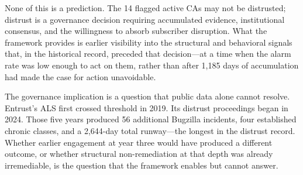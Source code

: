 \documentclass[10pt,twocolumn,letterpaper]{article}
\begin{document}
None of this is a prediction. The 14 flagged active CAs may not be distrusted; distrust
is a governance decision requiring accumulated evidence, institutional consensus, and the
willingness to absorb subscriber disruption. What the framework provides is earlier
visibility into the structural and behavioral signals that, in the historical record,
preceded that decision---at a time when the alarm rate was low enough to act on them,
rather than after 1,185 days of accumulation had made the case for action unavoidable.

The governance implication is a question that public data alone cannot resolve. Entrust's
ALS first crossed threshold in 2019. Its distrust proceedings began in 2024. Those five
years produced 56 additional Bugzilla incidents, four established chronic classes, and a
2,644-day total runway---the longest in the distrust record. Whether earlier engagement
at year three would have produced a different outcome, or whether structural
non-remediation at that depth was already irremediable, is the question that the
framework enables but cannot answer.
\end{document}
